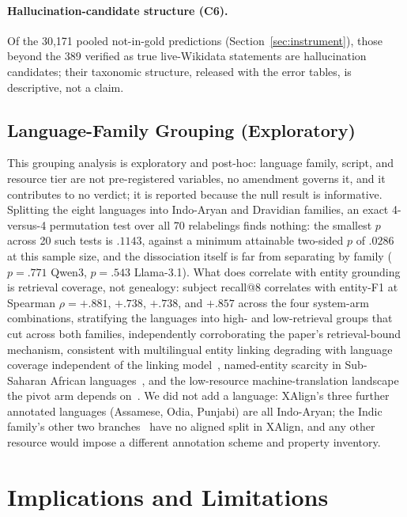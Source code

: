 \documentclass{llncs}
\begin{document}
\paragraph{Hallucination-candidate structure (C6).} Of the 30{,}171 pooled
not-in-gold predictions (Section~\ref{sec:instrument}), those beyond the 389
verified as true live-Wikidata statements are hallucination candidates;
their taxonomic structure, released with the error tables, is descriptive,
not a claim.

\subsection{Language-Family Grouping (Exploratory)}\label{sec:grouping}
This grouping analysis is exploratory and post-hoc: language family, script,
and resource tier are not pre-registered variables, no amendment governs it,
and it contributes to no verdict; it is reported because the null result is
informative. Splitting the eight languages into Indo-Aryan and Dravidian
families, an exact 4-versus-4 permutation test over all 70 relabelings finds nothing: the smallest $p$ across
20 such tests is $.1143$, against a minimum attainable two-sided $p$ of
$.0286$ at this sample size, and the dissociation itself is far from
separating by family ($p=.771$ Qwen3, $p=.543$ Llama-3.1). What does
correlate with entity grounding is retrieval coverage, not genealogy:
subject recall@8 correlates with entity-F1 at Spearman $\rho=+.881$,
$+.738$, $+.738$, and $+.857$ across the four system-arm combinations,
stratifying the languages into high- and low-retrieval groups that cut
across both families, independently corroborating the paper's
retrieval-bound mechanism, consistent with multilingual entity linking
degrading with language coverage independent of the linking
model~\cite{botha2020entitylinking100}, named-entity scarcity in
Sub-Saharan African languages~\cite{adelani2021masakhaner}, and the
low-resource machine-translation landscape the pivot arm depends
on~\cite{nllbteam2024scaling}. We did not add a language: XAlign's three
further annotated languages (Assamese, Odia, Punjabi) are all Indo-Aryan;
the Indic family's other two
branches~\cite{doddapaneni2023indicxtreme} have no aligned split
in XAlign, and any other resource would impose a different annotation
scheme and property inventory.

\section{Implications and Limitations}\label{sec:implications}
\end{document}
